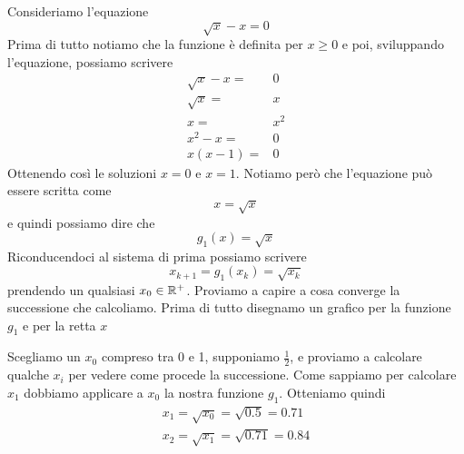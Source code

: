 \begin{example}
	Consideriamo l'equazione
	\[ \sqrt{x} - x = 0 \]
	Prima di tutto notiamo che la funzione è definita per $x \geq 0$ e poi, sviluppando l'equazione, possiamo
	scrivere
	\begin{align*}
		\sqrt{x} - x = & 0   \\
		\sqrt{x} =     & x   \\
		x =            & x^2 \\
		x^2 - x =      & 0   \\
		x (x - 1) =    & 0
	\end{align*}
	Ottenendo così le soluzioni $x = 0$ e $x = 1$. Notiamo però che l'equazione può essere scritta come
	\[ x = \sqrt{x} \]
	e quindi possiamo dire che
	\[ g_1(x) = \sqrt{x} \]
	Riconducendoci al sistema di prima possiamo scrivere
	\[ x_{k+1} = g_1(x_k) = \sqrt{x_k} \]
	prendendo un qualsiasi $x_0 \in \mathbb{R}^+$. Proviamo a capire a cosa converge la successione che calcoliamo.
	Prima di tutto disegnamo un grafico per la funzione $g_1$ e per la retta $x$
	\begin{center}
	\end{center}
	Scegliamo un $x_0$ compreso tra 0 e 1, supponiamo $\frac{1}{2}$, e proviamo a calcolare qualche $x_i$ per
	vedere come procede la successione. Come sappiamo per calcolare $x_1$ dobbiamo applicare a $x_0$ la nostra
	funzione $g_1$. Otteniamo quindi
	\begin{gather*}
		x_1 = \sqrt{x_0} = \sqrt{0.5} = 0.71 \\
		x_2 = \sqrt{x_1} = \sqrt{0.71} = 0.84
	\end{gather*}


\end{example}
